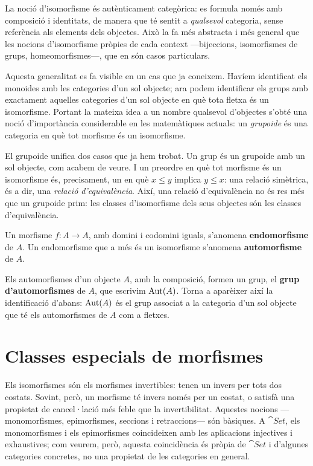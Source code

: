 \begin{observacio}
La noció d'isomorfisme és autènticament categòrica: es formula només amb composició i identitats, de manera que té sentit a \emph{qualsevol} categoria, sense referència als elements dels objectes. Això la fa més abstracta i més general que les nocions d'isomorfisme pròpies de cada context ---bijeccions, isomorfismes de grups, homeomorfismes---, que en són casos particulars.

Aquesta generalitat es fa visible en un cas que ja coneixem. Havíem identificat els monoides amb les categories d'un sol objecte; ara podem identificar els grups amb exactament aquelles categories d'un sol objecte en què tota fletxa és un isomorfisme. Portant la mateixa idea a un nombre qualsevol d'objectes s'obté una noció d'importància considerable en les matemàtiques actuals: un \emph{grupoide} és una categoria en què tot morfisme és un isomorfisme.

El grupoide unifica dos casos que ja hem trobat. Un grup és un grupoide amb un sol objecte, com acabem de veure. I un preordre en què tot morfisme és un isomorfisme és, precisament, un en què $x\le y$ implica $y\le x$: una relació simètrica, és a dir, una \emph{relació d'equivalència}. Així, una relació d'equivalència no és res més que un grupoide prim: les classes d'isomorfisme dels seus objectes són les classes d'equivalència.
\end{observacio}

\begin{definicio}
Un morfisme $f\colon A\to A$, amb domini i codomini iguals, s'anomena \textbf{endomorfisme} de $A$. Un endomorfisme que a més és un isomorfisme s'anomena \textbf{automorfisme} de $A$.
\end{definicio}

Els automorfismes d'un objecte $A$, amb la composició, formen un grup, el \textbf{grup d'automorfismes} de $A$, que escrivim $\operatorname{Aut}(A)$. Torna a aparèixer així la identificació d'abans: $\operatorname{Aut}(A)$ és el grup associat a la categoria d'un sol objecte que té els automorfismes de $A$ com a fletxes.

\section{Classes especials de morfismes}

Els isomorfismes són els morfismes invertibles: tenen un invers per tots dos costats. Sovint, però, un morfisme té invers només per un costat, o satisfà una propietat de cancel·lació més feble que la invertibilitat. Aquestes nocions ---monomorfismes, epimorfismes, seccions i retraccions--- són bàsiques. A $\cat{Set}$, els monomorfismes i els epimorfismes coincideixen amb les aplicacions injectives i exhaustives; com veurem, però, aquesta coincidència és pròpia de $\cat{Set}$ i d'algunes categories concretes, no una propietat de les categories en general.

